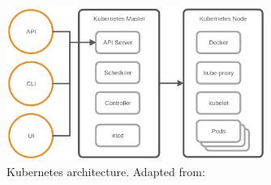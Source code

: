 \begin{figure}[H]
    \centering
    \includegraphics[width=0.75\textwidth]{resources/images/kubernetes_architecture.png}
    \caption[Kubernetes architecture]{Kubernetes architecture. Adapted from: \cite[p. 4]{MSV:2016}}
    \label{fig:kubernetes_architecture}
\end{figure}

